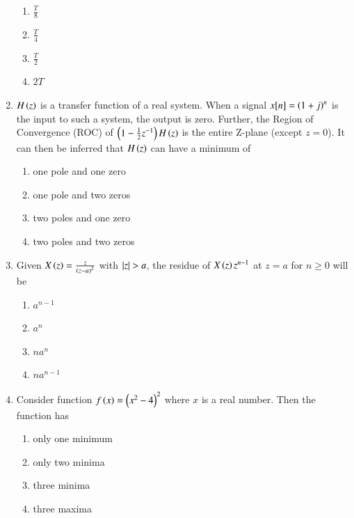 \documentclass[journal,12pt,onecolumn]{IEEEtran}
\theoremstyle{remark}
\begin{document}
\begin{enumerate}
      \begin{enumerate}
          \item $\frac{T}{8}$
          \item $\frac{T}{4}$
          \item $\frac{T}{2}$
          \item $2T$
      \end{enumerate}
      \item $H\left(z\right)$ is a transfer function of a real system. When a signal $x[n]=\left(1+j\right)^n$ is the input to such a system, the output is zero. Further, the Region of Convergence (ROC) of $\left(1-\frac{1}{2}z^{-1}\right)H\left(z\right)$ is the entire Z-plane (except $z=0$). It can then be inferred that $H\left(z\right)$ can have a minimum of
      \begin{enumerate}
          \item one pole and one zero
          \item one pole and two zeros
          \item two poles and one zero
          \item two poles and two zeros
      \end{enumerate}
      \item Given $X\left(z\right)=\frac{z}{\left(z-a\right)^2}$ with $\left\vert z\right\vert>a$, the residue of $X\left(z\right)z^{n-1}$ at $z=a$ for $n\geq 0$ will be
      \begin{enumerate}
          \item $a^{n-1}$
          \item $a^n$
          \item $n a^n$
          \item $na^{n-1}$
      \end{enumerate}
      \item Consider function $f\left(x\right)=\left(x^2-4\right)^2$ where $x$  is a real number. Then the function has
      \begin{enumerate}
          \item only one minimum
          \item only two minima
          \item three minima
          \item three maxima
      \end{enumerate}
\end{enumerate}
\end{document}
